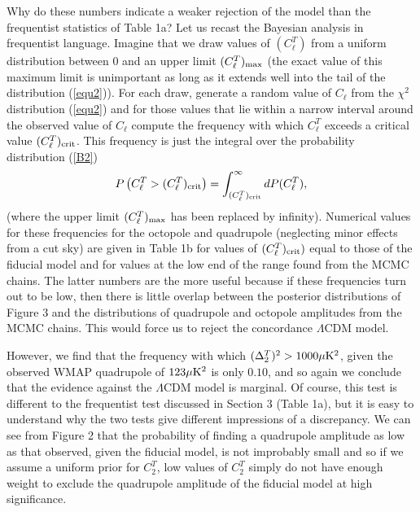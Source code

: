 Why do these numbers indicate a weaker rejection of the model than the
frequentist statistics of Table 1a?  Let us recast the Bayesian
analysis in frequentist language. Imagine that we draw values of
$(C^T_\ell)$ from a uniform distribution between $0$ and an upper
limit $(C^T_\ell)_{\rm max}$ (the exact value of this maximum limit is
unimportant as long as it extends well into the tail of the
distribution (\ref{equ2})). For each draw, generate a random value of
$C_\ell$ from the $\chi^2$ distribution (\ref{equ2}) and for those
values that lie within a narrow interval around the observed value of
$C_\ell$ compute the frequency with which $C_\ell^T$ exceeds a critical
value $(C_\ell^T)_{\rm crit}$.  This frequency is just the integral
over the probability distribution (\ref{B2})
\begin{equation}
   P\left ( C_\ell^T > (C_\ell^T)_{\rm crit} \right)  = \int_{(C_\ell^T)_{\rm crit}}^\infty dP(C_\ell^T),
  \label{B3} 
\end{equation}
(where the upper limit $(C^T_\ell)_{\rm max}$ has been replaced by
infinity). Numerical values for these frequencies for the octopole and
quadrupole (neglecting minor effects from a cut sky) are given in
Table 1b for values of $(C_\ell^T)_{\rm crit})$ equal to those of
the fiducial model and for values at the low end of the range found
from the MCMC chains. The latter numbers are the more useful because
if these frequencies turn out to be low, then there is little overlap
between the posterior distributions of Figure 3 and the distributions
of quadrupole and octopole amplitudes from the MCMC chains. This would
force us to reject the concordance $\Lambda$CDM model.

However, we find that the frequency with which $(\Delta^T_2)^2 >
1000\mk2$, given the observed WMAP quadrupole of $123 \mk2$ is only
$0.10$, and so again we conclude that the evidence against the
$\Lambda$CDM model is marginal. Of course, this test is different to
the frequentist test discussed in Section 3 (Table 1a), but it is easy
to understand why the two tests give different impressions of a discrepancy.
We can see from Figure 2 that the probability
of finding a quadrupole amplitude as low as that observed, given the
fiducial model, is not improbably small and so if we assume a uniform
prior for $C^T_2$, low values of $C^T_2$ simply do not have enough weight
to exclude the quadrupole amplitude of the fiducial model
at high significance.

